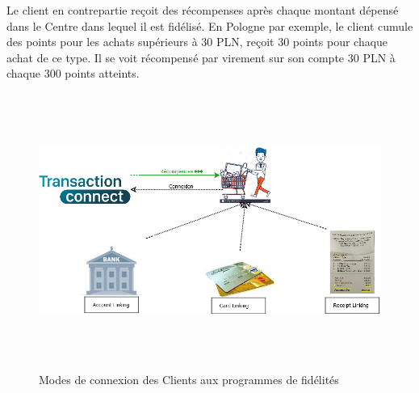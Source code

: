 \begin{enumerate}
\begin{itemize}
\end{itemize}
\newpage
Le client en contrepartie reçoit des récompenses après chaque montant dépensé dans le Centre dans lequel il est fidélisé. En Pologne par exemple, le client cumule des points pour les achats  supérieurs à 30 PLN, reçoit 30 points pour chaque achat de ce type. Il se voit récompensé par virement sur son compte 30 PLN à chaque 300 points atteints.
\begin{figure}[h]
\begin{center}
\includegraphics[width=15cm,height=9cm]{images/client_links.png}
\caption[Modes de connexion des Clients aux programmes de fidélités]{Modes de connexion des Clients aux programmes de fidélités}
\label{monlabel}
\end{center}
\end{figure}
\end{enumerate}
\newpage

